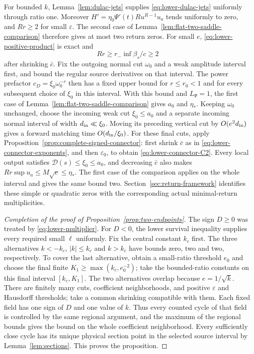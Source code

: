 For bounded $k$, Lemma~\ref{lem:dulac-jets} supplies
\eqref{eq:lower-dulac-jets} uniformly through ratio one.
Moreover $H'=\eta_0\Psi'(t)Ru^{R-1}u_a$ tends uniformly to zero,
and $Rr\ge2$ for small $\varepsilon$. The second case of
Lemma~\ref{lem:flat-two-saddle-comparison} therefore gives at most two
return zeros.
For small $e$, \eqref{eq:lower-positive-product} is exact and
\[
 Rr\ge r_-\inf\beta_s/c\ge2
\]
after shrinking $\bar c$. Fix the outgoing normal cut $\omega_0$ and a
weak amplitude interval first, and bound the regular source derivatives
on that interval. The power prefactor
$c_D=\xi_0\omega_0^{-r}$ then has a fixed upper bound for $r\le r_0<1$
and for every subsequent choice of $\xi_0$ in this interval.
With this bound and $L_\Psi=1$, the first case of
Lemma~\ref{lem:flat-two-saddle-comparison} gives $a_0$ and $\eta_*$.
Keeping $\omega_0$ unchanged, choose the incoming weak cut $\xi_0\le a_0$
and a separate incoming normal interval of width
$d_{\rm in}\ll\xi_0$. Moving its preceding vertical cut by
$O(e^2d_{\rm in})$ gives a forward matching time
$O(d_{\rm in}/\xi_0)$. For these final cuts, apply
Proposition~\ref{prop:complete-signed-connector}: first shrink $\bar c$
as in \eqref{eq:lower-connector-exponents}, and then $\varepsilon_0$,
to obtain \eqref{eq:lower-connector-C2}. Every local output satisfies
$\mathcal D(s)\le\xi_0\le a_0$, and decreasing $\bar c$ also makes
$Rr\sup u_a\le M\sqrt c\le\eta_*$. The first case of the comparison
applies on the whole interval and gives the same bound two.
Section~\ref{sec:return-framework} identifies these simple or quadratic
zeros with the corresponding actual minimal-return multiplicities.

\begin{proof}[Completion of the proof of Proposition~\ref{prop:two-endpoints}]
The sign $D\ge0$ was treated by \eqref{eq:lower-multiplier}.
For $D<0$, the lower survival inequality supplies every required small
$\ell$ uniformly. Fix the central constant $k_c$ first. The three
alternatives $k<-k_c$, $|k|\le k_c$ and $k>k_c$ have bounds zero,
two and two, respectively. To cover the last alternative, obtain a
small-ratio threshold $e_0$ and choose the final finite
$K_1\ge\max(k_c,e_0^{-2})$; take the bounded-ratio constants on
this final interval $[k_c,K_1]$. The two alternatives overlap because
$e=1/\sqrt k$.
There are finitely many cuts, coefficient neighborhoods, and positive
$\varepsilon$ and Hausdorff thresholds; take a common shrinking
compatible with them. Each fixed field has one sign of $D$ and one
value of $k$. Thus every counted cycle of that field is controlled by
the same regional argument, and the maximum of the regional bounds
gives the bound on the whole coefficient neighborhood. Every sufficiently
close cycle has its unique physical section point in the selected source
interval by
Lemma~\ref{lem:sections}. This proves the proposition.
\end{proof}

